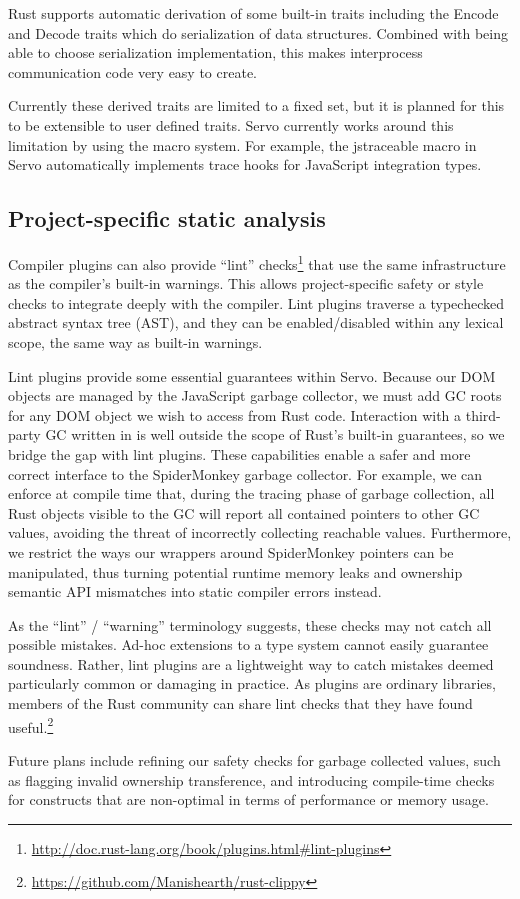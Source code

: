Rust supports automatic derivation of some built-in traits including the
Encode and Decode traits which do serialization of data structures. Combined
with being able to choose serialization implementation, this makes
interprocess communication code very easy to create.

Currently these derived traits are limited to a fixed set, but it is planned
for this to be extensible to user defined traits. Servo currently works around
this limitation by using the macro system. For example, the jstraceable macro
in Servo automatically implements trace hooks for JavaScript integration
types.

\subsection{Project-specific static analysis}

Compiler plugins can also provide ``lint'' checks\footnote{\url{http://doc.rust-lang.org/book/plugins.html#lint-plugins}} that use the same infrastructure as the compiler's built-in warnings. This allows project-specific safety or style checks to integrate deeply with the compiler. Lint plugins traverse a typechecked abstract syntax tree (AST), and they can be enabled/disabled within any lexical scope, the same way as built-in warnings.

Lint plugins provide some essential guarantees within Servo. Because our DOM objects are managed by the JavaScript garbage collector, we must add GC roots for any DOM object we wish to access from Rust code. Interaction with a third-party GC written in \Cplusplus{} is well outside the scope of Rust's built-in guarantees, so we bridge the gap with lint plugins. These capabilities enable a safer and more correct interface to the SpiderMonkey garbage collector. For example, we can enforce at compile time that, during the tracing phase of garbage collection, all Rust objects visible to the GC will report all contained pointers to other GC values, avoiding the threat of incorrectly collecting reachable values. Furthermore, we restrict the ways our wrappers around SpiderMonkey pointers can be manipulated, thus turning potential runtime memory leaks and ownership semantic API mismatches into static compiler errors instead.

As the ``lint'' / ``warning'' terminology suggests, these checks may not catch all possible mistakes. Ad-hoc extensions to a type system cannot easily guarantee soundness. Rather, lint plugins are a lightweight way to catch mistakes deemed particularly common or damaging in practice. As plugins are ordinary libraries, members of the Rust community can share lint checks that they have found useful.\footnote{\url{https://github.com/Manishearth/rust-clippy}}

Future plans include refining our safety checks for garbage collected values, such as flagging invalid ownership
transference, and introducing compile-time checks for constructs that are non-optimal in terms of performance or
memory usage.
